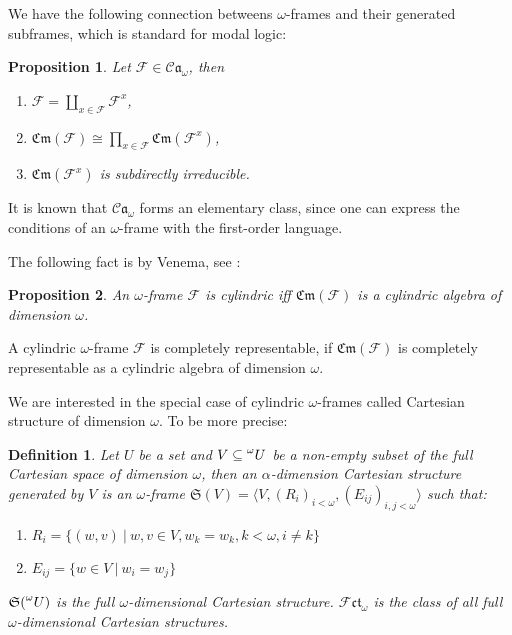 \documentclass[a4paper]{article}
\theoremstyle{defin}
\newtheorem{defin}{Definition}
\theoremstyle{theorem}
\theoremstyle{prop}
\newtheorem{prop}{Proposition}
\theoremstyle{lemma}
\theoremstyle{fact}
\theoremstyle{ex}
\theoremstyle{col}
\begin{document}
We have the following connection betweens $\omega$-frames and their generated subframes, which is standard for modal logic:
\begin{prop}
Let $\mathcal{F} \in \mathcal{C}\mathfrak{a}_{\omega}$, then
\begin{enumerate}
\item $\mathcal{F} = \coprod \limits_{x \in \mathcal{F}} \mathcal{F}^{x}$,
\item $\mathfrak{Cm}(\mathcal{F}) \cong \prod \limits_{x \in \mathcal{F}} \mathfrak{Cm}(\mathcal{F}^{x})$,
\item $\mathfrak{Cm}(\mathcal{F}^{x})$ is subdirectly irreducible.
\end{enumerate}
\end{prop}

It is known that $\mathcal{C}\mathfrak{a}_{\omega}$ forms an elementary class, since one can express the conditions of an $\omega$-frame with the first-order language.

The following fact is by Venema, see \cite[Proposition 2.1.5]{Venema2013}:
\begin{prop}
An $\omega$-frame $\mathcal{F}$ is cylindric iff $\mathfrak{Cm}(\mathcal{F})$ is a cylindric algebra of dimension $\omega$.
\end{prop}
A cylindric $\omega$-frame $\mathcal{F}$ is completely representable, if $\mathfrak{Cm}(\mathcal{F})$ is completely representable as a cylindric algebra of dimension $\omega$.

We are interested in the special case of cylindric $\omega$-frames called Cartesian structure of dimension $\omega$. To be more precise:

\begin{defin}
Let $U$ be a set and $V \subseteq \prescript{\omega}{}U$ be a non-empty subset of the full Cartesian space of dimension $\omega$, then an $\alpha$-dimension Cartesian structure generated by $V$ is an $\omega$-frame $\mathfrak{S}(V) = \langle V, (R_{i})_{i < \omega}, (E_{ij})_{i, j < \omega} \rangle$ such that:
\begin{enumerate}
\item $R_i = \{ (w, v) \: | \: w, v \in V, w_k = w_k, k < \omega, i \neq k \}$
\item $E_{ij} = \{ w \in V \: | \: w_i = w_j \}$
\end{enumerate}
$\mathfrak{S}(\prescript{\omega}{}U)$ is the full $\omega$-dimensional Cartesian structure. $\mathcal{F} \mathfrak{c}\mathfrak{t}_{\omega}$ is the class of all full $\omega$-dimensional Cartesian structures.
\end{defin}
\end{document}
